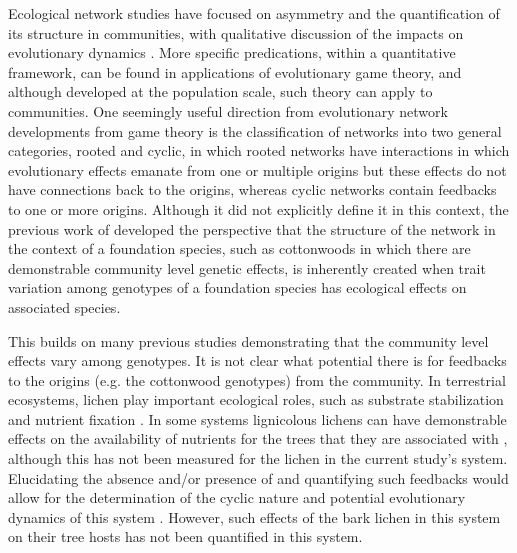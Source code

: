 \documentclass[fleqn,12pt]{olplainarticle}
\begin{document}
Ecological network studies have focused on asymmetry and the
quantification of its structure in communities, with qualitative
discussion of the impacts on evolutionary dynamics
\citep{Bascompte2006, Diaz-Castelazo2010, Guimaraes2011,
  Thompson2013}. More specific predications, within a quantitative
framework, can be found in applications of evolutionary game theory,
and although developed at the population scale, such theory can apply
to communities. One seemingly useful direction from evolutionary
network developments from game theory is the classification of
networks into two general categories, rooted and cyclic, in which
rooted networks have interactions in which evolutionary effects
emanate from one or multiple origins but these effects do not have
connections back to the origins, whereas cyclic networks contain
feedbacks to one or more origins. Although it did not explicitly
define it in this context, the previous work of \cite{Lau2017a}
developed the perspective that the structure of the network in the
context of a foundation species, such as cottonwoods in which there
are demonstrable community level genetic effects, is inherently
created when trait variation among genotypes of a foundation species
has ecological effects on associated species.

This builds on many previous studies demonstrating that the community
level effects vary among genotypes. It is not clear what potential
there is for feedbacks to the origins (e.g. the cottonwood genotypes)
from the community. In terrestrial ecosystems, lichen play important
ecological roles, such as substrate stabilization
\citep{Root2011BioticWashington} and nutrient fixation
\citep{Nelson2018LichenHelens}. In some systems lignicolous lichens
can have demonstrable effects on the availability of nutrients for the
trees that they are associated with \citep{Norby1989NitrogenDioxide},
although this has not been measured for the lichen in the current
study's system. Elucidating the absence and/or presence of and
quantifying such feedbacks would allow for the determination of the
cyclic nature and potential evolutionary dynamics of this system
\citep{Lieberman2005EvolutionaryGraphs}. However, such effects of the
bark lichen in this system on their tree hosts has not been quantified
in this system.
\end{document}
